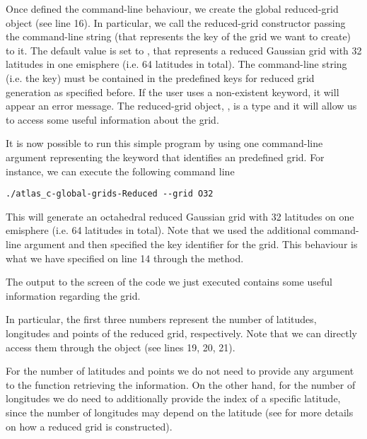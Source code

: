 %

%
Once defined the command-line behaviour, we create the global 
reduced-grid object (see line 16). In particular, we call the 
reduced-grid constructor passing the command-line string (that 
represents the key of the grid we want to create) to it.
The default value is set to , that represents 
a reduced Gaussian grid with 32 latitudes in one emisphere 
(i.e. 64 latitudes in total).  
The command-line string (i.e. the key) must be contained 
in the predefined keys for reduced grid generation as specified 
before. If the user uses a non-existent keyword, it will 
appear an error message.
The reduced-grid object, , is 
a  type and it will allow 
us to access some useful information about the grid.  

It is now possible to run this simple program by using one 
command-line argument representing the keyword that identifies 
an \Atlas predefined grid. For instance, we can execute the 
following command line
%
\begin{lstlisting}[style=BashStyle]
./atlas_c-global-grids-Reduced --grid O32
\end{lstlisting}
% 
This will generate an octahedral reduced Gaussian grid with 
32 latitudes on one emisphere (i.e. 64 latitudes in total).
Note that we used the additional command-line argument 
 and then specified the key identifier 
for the grid. This behaviour is what we have specified 
on line 14 through the  method.

The output to the screen of the code we just executed 
contains some useful information regarding the grid. 

In particular, the first three numbers represent the 
number of latitudes, longitudes and points of the reduced
grid, respectively. Note that we can directly access them 
through the  object (see lines 19, 20, 21).
\begin{tipbox}
For the number of latitudes and points we do not need to provide
any argument to the function retrieving the information. On the 
other hand, for the number of longitudes we do need to additionally 
provide the index of a specific latitude, since the number of 
longitudes may depend on the latitude (see  
for more details on how a reduced grid is constructed). 
\end{tipbox}

